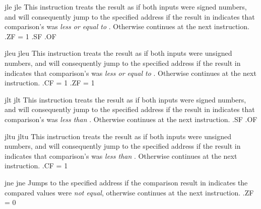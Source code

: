 \begin{instruction}{jle}
  \jumptype
     {jle}
     {\jjleopc}
     {This instruction treats the  result as if both
       inputs were signed numbers, and will consequently jump to the
       specified address if the result in  indicates that
       comparison's  was \emph{less or equal to} .
       Otherwise continues at the next instruction.}
     {.ZF = 1 \vee {}.SF \neq {}.OF}
\end{instruction}

\begin{instruction}{jleu}
  \jumptype
     {jleu}
     {\jjleuopc}
     {This instruction treats the  result as if both
       inputs were unsigned numbers, and will consequently jump to the
       specified address if the result in  indicates that
       comparison's  was \emph{less or equal to} .
       Otherwise continues at the next instruction.}
     {.CF = 1 \vee {}.ZF = 1}
\end{instruction}

\begin{instruction}{jlt}
  \jumptype
     {jlt}
     {\jjltopc}
     {This instruction treats the  result as if both
       inputs were signed numbers, and will consequently jump to the
       specified address if the result in  indicates that
       comparison's  was \emph{less than} .
       Otherwise continues at the next instruction.}
     {.SF \neq {}.OF}
\end{instruction}

\begin{instruction}{jltu}
  \jumptype
     {jltu}
     {\jjltuopc}
     {This instruction treats the  result as if both
       inputs were unsigned numbers, and will consequently jump to the
       specified address if the result in  indicates that
       comparison's  was \emph{less than} .
       Otherwise continues at the next instruction.}
     {.CF = 1}
\end{instruction}

\begin{instruction}{jne}
  \jumptype
     {jne}
     {\jjneopc}
     {Jumps to the specified address if the comparison result in 
       indicates the compared values were \emph{not equal}, otherwise continues
       at the next instruction.}
     {.ZF = 0}
\end{instruction}


